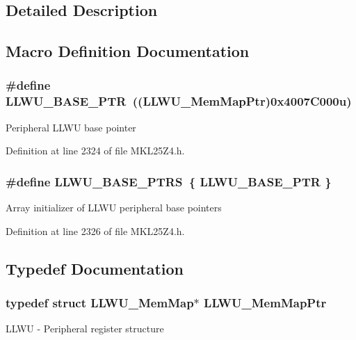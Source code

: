 \subsection{Detailed Description}


\subsection{Macro Definition Documentation}
\subsubsection[{\texorpdfstring{L\+L\+W\+U\+\_\+\+B\+A\+S\+E\+\_\+\+P\+TR}{LLWU_BASE_PTR}}]{\setlength{\rightskip}{0pt plus 5cm}\#define L\+L\+W\+U\+\_\+\+B\+A\+S\+E\+\_\+\+P\+TR~(({\bf L\+L\+W\+U\+\_\+\+Mem\+Map\+Ptr})0x4007\+C000u)}\hypertarget{group___l_l_w_u___peripheral_ga89c97b9e8756088cb3d8617c022ae6ac}{}\label{group___l_l_w_u___peripheral_ga89c97b9e8756088cb3d8617c022ae6ac}
Peripheral L\+L\+WU base pointer 

Definition at line 2324 of file M\+K\+L25\+Z4.\+h.

\subsubsection[{\texorpdfstring{L\+L\+W\+U\+\_\+\+B\+A\+S\+E\+\_\+\+P\+T\+RS}{LLWU_BASE_PTRS}}]{\setlength{\rightskip}{0pt plus 5cm}\#define L\+L\+W\+U\+\_\+\+B\+A\+S\+E\+\_\+\+P\+T\+RS~\{ {\bf L\+L\+W\+U\+\_\+\+B\+A\+S\+E\+\_\+\+P\+TR} \}}\hypertarget{group___l_l_w_u___peripheral_ga4826d688973513cc02a2f1d4f67c336b}{}\label{group___l_l_w_u___peripheral_ga4826d688973513cc02a2f1d4f67c336b}
Array initializer of L\+L\+WU peripheral base pointers 

Definition at line 2326 of file M\+K\+L25\+Z4.\+h.



\subsection{Typedef Documentation}
\subsubsection[{\texorpdfstring{L\+L\+W\+U\+\_\+\+Mem\+Map\+Ptr}{LLWU_MemMapPtr}}]{\setlength{\rightskip}{0pt plus 5cm}typedef struct {\bf L\+L\+W\+U\+\_\+\+Mem\+Map}$\ast$ {\bf L\+L\+W\+U\+\_\+\+Mem\+Map\+Ptr}}\hypertarget{group___l_l_w_u___peripheral_ga03cfefad45ecbfeb2cd16eb85ccfe186}{}\label{group___l_l_w_u___peripheral_ga03cfefad45ecbfeb2cd16eb85ccfe186}
L\+L\+WU -\/ Peripheral register structure 